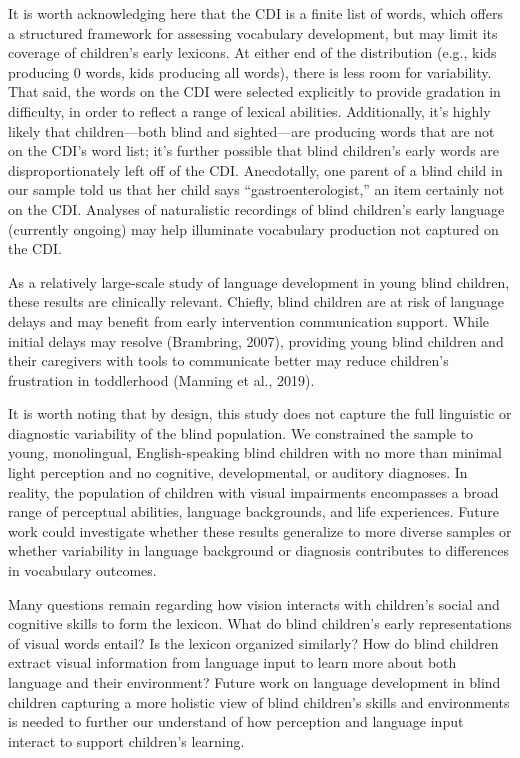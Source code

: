 \documentclass[
  man,floatsintext]{apa6}
\begin{document}
It is worth acknowledging here that the CDI is a finite list of words, which offers a structured framework for assessing vocabulary development, but may limit its coverage of children's early lexicons. At either end of the distribution (e.g., kids producing 0 words, kids producing all words), there is less room for variability. That said, the words on the CDI were selected explicitly to provide gradation in difficulty, in order to reflect a range of lexical abilities. Additionally, it's highly likely that children---both blind and sighted---are producing words that are not on the CDI's word list; it's further possible that blind children's early words are disproportionately left off of the CDI. Anecdotally, one parent of a blind child in our sample told us that her child says ``gastroenterologist,'' an item certainly not on the CDI. Analyses of naturalistic recordings of blind children's early language (currently ongoing) may help illuminate vocabulary production not captured on the CDI.

As a relatively large-scale study of language development in young blind children, these results are clinically relevant. Chiefly, blind children are at risk of language delays and may benefit from early intervention communication support. While initial delays may resolve (Brambring, 2007), providing young blind children and their caregivers with tools to communicate better may reduce children's frustration in toddlerhood (Manning et al., 2019).

It is worth noting that by design, this study does not capture the full linguistic or diagnostic variability of the blind population. We constrained the sample to young, monolingual, English-speaking blind children with no more than minimal light perception and no cognitive, developmental, or auditory diagnoses. In reality, the population of children with visual impairments encompasses a broad range of perceptual abilities, language backgrounds, and life experiences. Future work could investigate whether these results generalize to more diverse samples or whether variability in language background or diagnosis contributes to differences in vocabulary outcomes.

Many questions remain regarding how vision interacts with children's social and cognitive skills to form the lexicon. What do blind children's early representations of visual words entail? Is the lexicon organized similarly? How do blind children extract visual information from language input to learn more about both language and their environment? Future work on language development in blind children capturing a more holistic view of blind children's skills and environments is needed to further our understand of how perception and language input interact to support children's learning.
\end{document}
